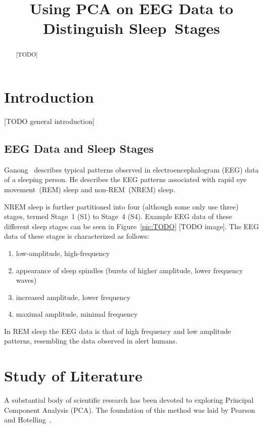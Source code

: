 \documentclass[a4paper]{IEEEtran}
\title{Using PCA on EEG Data to Distinguish Sleep~Stages}
\author{\IEEEauthorblockN{Ida Hönigmann}
	\IEEEauthorblockA{\\Technical University Vienna, Austria\\
		Email: e12002348@student.tuwien.ac.at}}
\begin{document}
\maketitle

\begin{abstract}
[TODO]
\end{abstract}

\section{Introduction}
\label{sec:introduction}

[TODO general introduction]

\subsection{EEG Data and Sleep Stages}

Ganong~\cite{Ganong1997} describes typical patterns observed in electroencephalogram (EEG) data of a sleeping person. He describes the EEG patterns associated with rapid eye movement~(REM) sleep and non-REM~(NREM) sleep.

NREM sleep is further partitioned into four (although some only use three) stages, termed Stage~1 (S1) to Stage~4 (S4). Example EEG data of these different sleep stages can be seen in Figure~\ref{pic:TODO} [TODO image]. The EEG data of these stages is characterized as follows:

\begin{enumerate}[label={S\arabic*:}]
\item low-amplitude, high-frequency
\item appearance of sleep spindles (bursts of higher amplitude, lower frequency waves)
\item increased amplitude, lower frequency
\item maximal amplitude, minimal frequency
\end{enumerate}

In REM sleep the EEG data is that of high frequency and low amplitude patterns, resembling the data observed in alert humans.

\section{Study of Literature}
\label{sec:study_of_literature}

A substantial body of scientific research has been devoted to exploring Principal Component Analysis (PCA).
The foundation of this method was laid by Pearson~\cite{Pearson1901} and Hotelling~\cite{Hotelling1933}.
\end{document}
